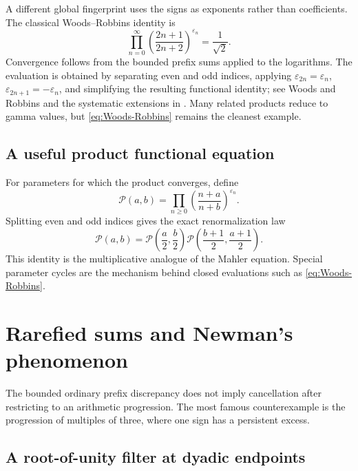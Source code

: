 \documentclass[11pt,oneside]{article}
\theoremstyle{definition}
\theoremstyle{remark}
\newcommand{\eps}{\varepsilon}
\begin{document}
A different global fingerprint uses the signs as exponents rather than coefficients.
The classical Woods--Robbins identity is
\begin{equation}
  \boxed{
  \prod_{n=0}^{\infty}
  \left(\frac{2n+1}{2n+2}\right)^{\eps_n}=\frac1{\sqrt2}.} \label{eq:Woods-Robbins}
\end{equation}
Convergence follows from the bounded prefix sums applied to the logarithms.  The evaluation
is obtained by separating even and odd indices, applying
\(\eps_{2n}=\eps_n\), \(\eps_{2n+1}=-\eps_n\), and simplifying the resulting functional
identity; see Woods and Robbins and the systematic extensions in
\cite{woods1978,robbins1979,alloucheriasatshallit2019}.  Many related products reduce to
gamma values, but \eqref{eq:Woods-Robbins} remains the cleanest example.

\subsection{A useful product functional equation}

For parameters for which the product converges, define
\begin{equation}
  \mathcal P(a,b)=\prod_{n\ge0}\left(\frac{n+a}{n+b}\right)^{\eps_n}.          \label{eq:parameter-product}
\end{equation}
Splitting even and odd indices gives the exact renormalization law
\begin{equation}
  \boxed{
  \mathcal P(a,b)=
  \mathcal P\!\left(\frac a2,\frac b2\right)
  \mathcal P\!\left(\frac{b+1}{2},\frac{a+1}{2}\right).}   \label{eq:parameter-product-functional}
\end{equation}
This identity is the multiplicative analogue of the Mahler equation.  Special parameter
cycles are the mechanism behind closed evaluations such as
\eqref{eq:Woods-Robbins}.

\section{Rarefied sums and Newman's phenomenon}
\label{sec:rarefied}

The bounded ordinary prefix discrepancy does not imply cancellation after restricting to an
arithmetic progression.  The most famous counterexample is the progression of multiples of
three, where one sign has a persistent excess.

\subsection{A root-of-unity filter at dyadic endpoints}
\end{document}
